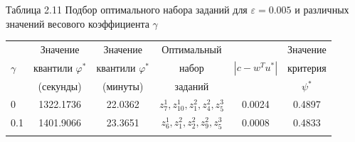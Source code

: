 \documentclass[14pt, a4paper]{extarticle}
\numberwithin{equation}{section}
\begin{document}
{\begin{table}[h!]
\centering
\begin{flushright}
Таблица 2.11 Подбор оптимального набора заданий для $\varepsilon=0.005$ и различных значений весового коэффициента $\gamma$
\end{flushright}
\begin{tabular}{|>{\centering}m{30pt}|c|c|c|c|c|}
\hline
			&Значение  						   &Значение   				&Оптимальный&				  &Значение \\
$\gamma$	&квантили $\varphi^\ast$           &квантили $\varphi^\ast$ &набор 		&$|c-w^T u^\ast|$ &критерия  \\
			&(секунды)						   &(минуты)  				& заданий   &				  &$\psi^\ast$ \\ \cline{1-6}
0					& 1322.1736		& 22.0362		& $z^1_7, z^1_{10}, z^2_1, z^2_4, z^3_5$	& 0.0024			& 0.4897 \\ \cline{1-6}
0.1					& 1401.9066		& 23.3651		& $z^1_6, z^2_1, z^2_2, z^2_9, z^3_5$		& 0.0008			& 0.4833 \\ \cline{1-6}

\end{tabular}
\label{ch2}
\end{table}

}
\end{document}
